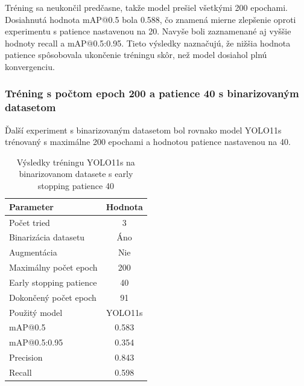                 Tréning sa neukončil predčasne, takže model prešiel všetkými 200 epochami. Dosiahnutá hodnota mAP@0.5 bola 0.588, čo znamená mierne zlepšenie oproti experimentu s patience nastavenou na 20. Navyše boli zaznamenané aj vyššie hodnoty recall a mAP@0.5:0.95. Tieto výsledky naznačujú, že nižšia hodnota patience spôsobovala ukončenie tréningu skôr, než model dosiahol plnú konvergenciu.

                \subsubsection{Tréning s počtom epoch 200 a patience 40 s binarizovaným datasetom}

                Ďalší experiment s binarizovaným datasetom bol rovnako model YOLO11s trénovaný s maximálne 200 epochami a hodnotou patience nastavenou na 40.

                \begin{table}[H]
                    \centering
                    \begin{tabular}{|l|c|}
                    \hline
                    \textbf{Parameter} & \textbf{Hodnota} \\ \hline
                    Počet tried & 3 \\ \hline
                    Binarizácia datasetu & Áno \\ \hline
                    Augmentácia & Nie \\ \hline
                    Maximálny počet epoch & 200 \\ \hline
                    Early stopping patience & 40 \\ \hline
                    Dokončený počet epoch & 91 \\ \hline
                    Použitý model & YOLO11s \\ \hline
                    mAP@0.5 & 0.583 \\ \hline
                    mAP@0.5:0.95 & 0.354 \\ \hline
                    Precision & 0.843 \\ \hline
                    Recall & 0.598 \\ \hline
                    \end{tabular}
                    \caption{Výsledky tréningu YOLO11s na binarizovanom datasete s early stopping patience 40}
                    \label{tab:yolo11s_binary_earlystop_p40}
                \end{table}

